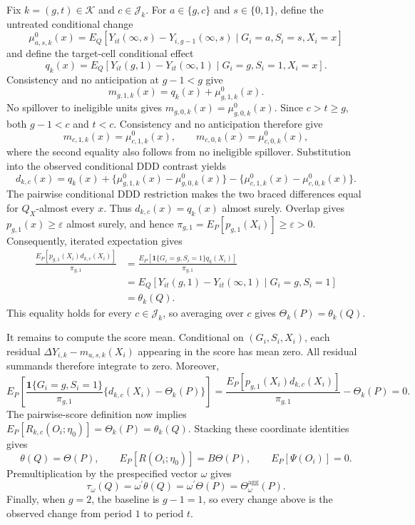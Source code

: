 Fix \(k=(g,t)\in\mathcal K\) and \(c\in\mathcal J_k\).  For \(a\in\{g,c\}\) and \(s\in\{0,1\}\), define the untreated conditional change
\[
 \mu^0_{a,s,k}(x)
 =E_Q\!\left[Y_{it}(\infty,s)-Y_{i,g-1}(\infty,s)
       \mid G_i=a,S_i=s,X_i=x\right]
\]
and define the target-cell conditional effect
\[
 q_k(x)=E_Q\!\left[Y_{it}(g,1)-Y_{it}(\infty,1)
       \mid G_i=g,S_i=1,X_i=x\right].
\]
Consistency and no anticipation at \(g-1<g\) give
\[
 m_{g,1,k}(x)=q_k(x)+\mu^0_{g,1,k}(x).
\]
No spillover to ineligible units gives \(m_{g,0,k}(x)=\mu^0_{g,0,k}(x)\).  Since \(c>t\ge g\), both \(g-1<c\) and \(t<c\).  Consistency and no anticipation therefore give
\[
 m_{c,1,k}(x)=\mu^0_{c,1,k}(x),
 \qquad
 m_{c,0,k}(x)=\mu^0_{c,0,k}(x),
\]
where the second equality also follows from no ineligible spillover.  Substitution into the observed conditional DDD contrast yields
\[
 d_{k,c}(x)=q_k(x)
 +\{\mu^0_{g,1,k}(x)-\mu^0_{g,0,k}(x)\}
 -\{\mu^0_{c,1,k}(x)-\mu^0_{c,0,k}(x)\}.
\]
The pairwise conditional DDD restriction makes the two braced differences equal for \(Q_X\)-almost every \(x\).  Thus \(d_{k,c}(x)=q_k(x)\) almost surely.  Overlap gives \(p_{g,1}(x)\ge\varepsilon\) almost surely, and hence
\(\pi_{g,1}=E_P[p_{g,1}(X_i)]\ge\varepsilon>0\).  Consequently, iterated expectation gives
\[
\begin{aligned}
 \frac{E_P[p_{g,1}(X_i)d_{k,c}(X_i)]}{\pi_{g,1}}
 &=\frac{E_P[\mathbf 1\{G_i=g,S_i=1\}q_k(X_i)]}{\pi_{g,1}}\\
 &=E_Q[Y_{it}(g,1)-Y_{it}(\infty,1)\mid G_i=g,S_i=1]\\
 &=\theta_k(Q).
\end{aligned}
\]
This equality holds for every \(c\in\mathcal J_k\), so averaging over \(c\) gives \(\Theta_k(P)=\theta_k(Q)\).

It remains to compute the score mean.  Conditional on \((G_i,S_i,X_i)\), each residual \(\Delta Y_{i,k}-m_{a,s,k}(X_i)\) appearing in the score has mean zero.  All residual summands therefore integrate to zero.  Moreover,
\[
 E_P\!\left[\frac{\mathbf 1\{G_i=g,S_i=1\}}{\pi_{g,1}}
 \{d_{k,c}(X_i)-\Theta_k(P)\}\right]
 =\frac{E_P[p_{g,1}(X_i)d_{k,c}(X_i)]}{\pi_{g,1}}-\Theta_k(P)=0.
\]
The pairwise-score definition now implies
\(E_P[R_{k,c}(O_i;\eta_0)]=\Theta_k(P)=\theta_k(Q)\).  Stacking these coordinate identities gives
\[
 \theta(Q)=\Theta(P),\qquad
 E_P[R(O_i;\eta_0)]=B\Theta(P),\qquad
 E_P[\Psi(O_i)]=0.
\]
Premultiplication by the prespecified vector \(\omega\) gives
\[
 \tau_\omega(Q)=\omega^{\prime}\theta(Q)
 =\omega^{\prime}\Theta(P)=\Theta_\omega^{\mathrm{agg}}(P).
\]
Finally, when \(g=2\), the baseline is \(g-1=1\), so every change above is the observed change from period \(1\) to period \(t\).